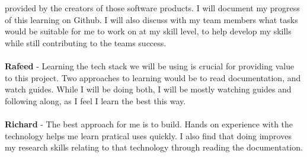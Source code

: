 \documentclass[12pt]{article}
\begin{document}
\begin{enumerate}
    provided by the creators of those software products. I will
    document my progress of this learning on Github. I will also
    discuss with my team members what tasks would be suitable for me
    to work on at my skill level, to help develop my skills while
    still contributing to the teams success. \\
    \\
    \textbf{Rafeed} - Learning the tech stack we will be using is
    crucial for providing value to this project. Two approaches to
    learning would be to read documentation, and watch guides. While
    I will be doing both, I will be mostly watching guides and
    following along, as I feel I learn the best this way. \\
    \\
    \textbf{Richard} - The best approach for me is to build. Hands on experience
    with the technology helps me learn pratical uses quickly. I also find that
    doing improves my research skills relating to that technology
    through reading
    the documentation.\\
\end{enumerate}
\end{document}
